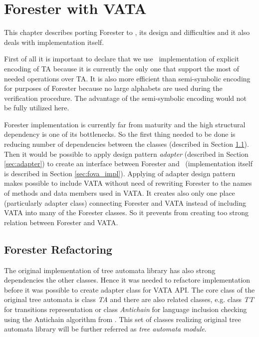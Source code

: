 \chapter{Forester with VATA}
\label{ch:fova}

This chapter describes porting Forester to \vata, its design and difficulties and it also deals with implementation
itself.

First of all it is important to declare that we use \vata\ implementation of explicit encoding of TA because
it is currently the only one that support the most of needed operations over TA.
It is also more efficient than
semi-symbolic encoding for purposes of Forester because no large alphabets are used during the verification procedure.
The advantage of the semi-symbolic encoding would not be fully utilized here.

Forester implementation is currently far from maturity and the high structural dependency is
one of its bottlenecks.
So the first thing needed to be done is reducing number of dependencies between the classes (described in Section \ref{sec:forester_prep}).
Then it would be possible to apply design pattern \emph{adapter} \cite{gamma95} (described in Section \ref{sec:adapter}) to create
an interface between Forester and \vata\ (implementation itself is described in Section \ref{sec:fova_impl}).
Applying of adapter design pattern makes possible to include VATA without need of rewriting
Forester to the names of methods and data members used in VATA.
It creates also only one place (particularly adapter class) connecting Forester and VATA instead of
including VATA into many of the Forester classes.
So it prevents from creating too strong relation between Forester and VATA.

\section{Forester Refactoring}
\label{sec:forester_prep}

The original implementation of tree automata library has also strong dependencies
the other classes.
Hence it was needed to refactore implementation before it was possible to create adapter class for VATA API.
The core class of the original tree automata is class \emph{TA} and there are also related classes,
e.g. class \emph{TT} for transitions representation or class \emph{Antichain} for language inclusion checking using the Antichain algorithm from \cite{tacas10}.
This set of classes realizing original tree automata library will be further referred as \emph{tree automata module}.

